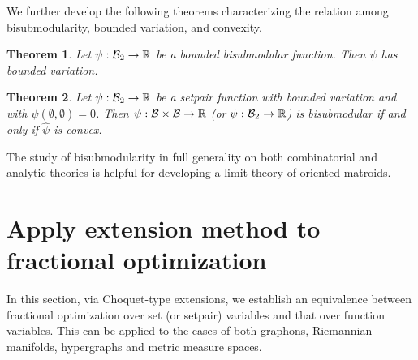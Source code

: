 \documentclass[12pt,a4paper]{article}
\newtheorem{theorem}{Theorem}[section]
\begin{document}
We further develop the following theorems characterizing the relation among bisubmodularity, bounded variation, and convexity.

\begin{theorem}
Let $\psi:\mathcal{B}_2\to\mathbb{R}$ be a bounded bisubmodular function. Then $\psi$ has  bounded variation.
\end{theorem}

\begin{theorem}\label{thm:bisubmodular}Let $\psi:\mathcal{B}_2\to\mathbb{R}$ be a setpair function with bounded variation and with $\psi(\emptyset,\emptyset)=0$. Then 
$\psi:\mathcal{B}\times\mathcal{B}\to\mathbb{R}$ (or $\psi:\mathcal{B}_2\to \mathbb{R}$) is bisubmodular if and only if $\widehat{\psi}$ is convex.
\end{theorem}



The study of bisubmodularity in full generality on both combinatorial and analytic theories is helpful for developing a limit theory of oriented matroids. 

\section{Apply extension method to fractional optimization}\label{sec:frac}
In this section, via Choquet-type extensions, we establish an equivalence between fractional optimization over set (or setpair) variables and that over function variables. 
This can be applied to the cases of both graphons, Riemannian manifolds, hypergraphs and metric measure spaces. 
\end{document}
